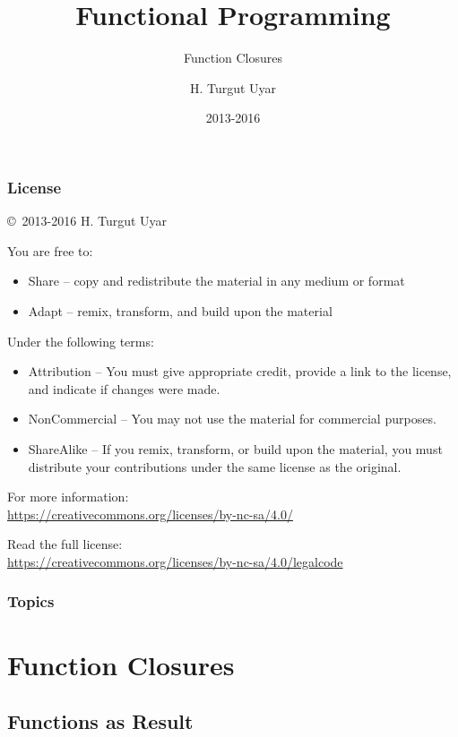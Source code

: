 \documentclass[dvipsnames]{beamer}
\title{Functional Programming}
\subtitle{Function Closures}
\author{H. Turgut Uyar}
\date{2013-2016}
\theoremstyle{plain}
\begin{document}
\begin{frame}
  \titlepage
\end{frame}

\begin{frame}
  \frametitle{License}

  \hfill
  \copyright~2013-2016 H. Turgut Uyar

  \vfill
  \begin{footnotesize}
    You are free to:
    \begin{itemize}
      \itemsep0em
      \item Share -- copy and redistribute the material in any medium or format
      \item Adapt -- remix, transform, and build upon the material
    \end{itemize}

    Under the following terms:
    \begin{itemize}
      \itemsep0em
      \item Attribution -- You must give appropriate credit, provide a link to
        the license, and indicate if changes were made.

      \item NonCommercial -- You may not use the material for commercial
        purposes.

      \item ShareAlike -- If you remix, transform, or build upon the material,
        you must distribute your contributions under the same license as the
        original.
    \end{itemize}

    For more information:\\
    \url{https://creativecommons.org/licenses/by-nc-sa/4.0/}

    \smallskip
    Read the full license:\\
    \url{https://creativecommons.org/licenses/by-nc-sa/4.0/legalcode}
  \end{footnotesize}
\end{frame}

\begin{frame}
  \frametitle{Topics}
  \tableofcontents
\end{frame}

\section{Function Closures}

\subsection{Functions as Result}
\end{document}
